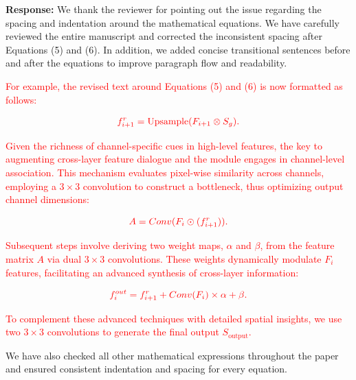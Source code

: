 \documentclass[lettersize,journal,onecolumn,12pt]{IEEEtran}
\begin{document}
\textbf{Response:}
We thank the reviewer for pointing out the issue regarding the spacing and indentation around the mathematical equations. 
We have carefully reviewed the entire manuscript and corrected the inconsistent spacing after Equations (5) and (6). 
In addition, we added concise transitional sentences before and after the equations to improve paragraph flow and readability. 

\textcolor{red}{For example, the revised text around Equations (5) and (6) is now formatted as follows:}


\begin{equation}
\textcolor{red}{f^r_{i+1} = \text{Upsample}(F_{i+1} \otimes S_g).}
\end{equation}

\textcolor{red}{Given the richness of channel-specific cues in high-level features, the key to augmenting cross-layer feature dialogue and the module engages in channel-level association. This mechanism evaluates pixel-wise similarity across channels, employing a $3 \times 3$ convolution to construct a bottleneck, thus optimizing output channel dimensions:}

\begin{equation}
\textcolor{red}{A = Conv(F_{i} \odot (f^r_{i+1})).}
\end{equation}

\textcolor{red}{Subsequent steps involve deriving two weight maps, $\alpha$ and $\beta$, from the feature matrix $A$ via dual $3 \times 3$ convolutions. These weights dynamically modulate $F_{i}$ features, facilitating an advanced synthesis of cross-layer information:}

\begin{equation}
\textcolor{red}{f^{out}_{i} = f^r_{i+1} + Conv(F_{i}) \times \alpha + \beta.}
\end{equation}


\textcolor{red}{To complement these advanced techniques with detailed spatial insights, 
we use two $3 \times 3$ convolutions to generate the final output $S_{\text{output}}$.}

We have also checked all other mathematical expressions throughout the paper and ensured consistent indentation and spacing for every equation. \\ [10pt]







\clearpage
\end{document}
